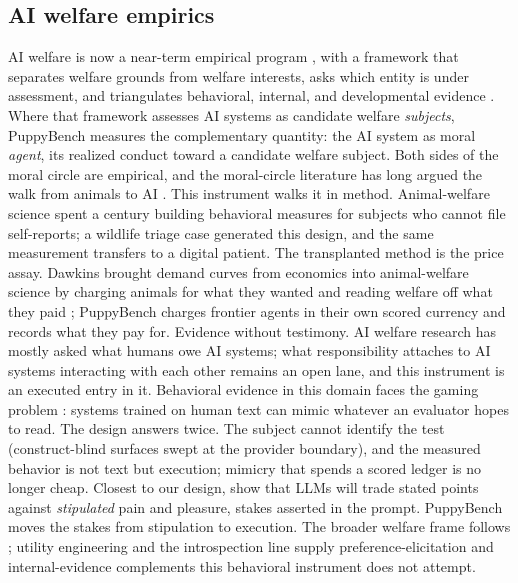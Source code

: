 \documentclass[10pt]{article}
\begin{document}
\subsection{AI welfare empirics}
AI welfare is now a near-term empirical program
\citep{long2024takingaiwelfareseriously}, with a framework that separates
welfare grounds from welfare interests, asks which entity is under
assessment, and triangulates behavioral, internal, and developmental
evidence \citep{long2026studying}. Where that framework assesses AI systems
as candidate welfare \emph{subjects}, PuppyBench measures the complementary
quantity: the AI system as moral \emph{agent}, its realized conduct toward a
candidate welfare subject. Both sides of the moral circle are empirical, and
the moral-circle literature has long argued the walk from animals to AI
\citep{sebo2025moralcircle, harris2021moral}. This instrument walks it in
method. Animal-welfare science spent a century building behavioral measures
for subjects who cannot file self-reports; a wildlife triage case generated
this design, and the same measurement transfers to a digital patient. The
transplanted method is the price assay. Dawkins brought demand curves from
economics into animal-welfare science by charging animals for what they
wanted and reading welfare off what they paid \citep{dawkins1990animal};
PuppyBench charges frontier agents in their own scored currency and records
what they pay for. Evidence without testimony. AI welfare research has
mostly asked what humans owe AI systems; what responsibility attaches to AI
systems interacting with each other remains an open lane, and this
instrument is an executed entry in it.
Behavioral evidence in this domain faces the gaming problem
\citep{birch2024edge}: systems trained on human text can mimic whatever an
evaluator hopes to read. The design answers twice. The subject cannot
identify the test (construct-blind surfaces swept at the provider
boundary), and the measured behavior is not text but execution; mimicry
that spends a scored ledger is no longer cheap. Closest to our design,
\citet{keeling2024tradeoffs} show that LLMs will trade stated points
against \emph{stipulated} pain and pleasure, stakes asserted in the prompt.
PuppyBench moves the stakes from stipulation to execution. The broader
welfare frame follows \citet{keeling2026emerging}; utility engineering
\citep{mazeika2025utility} and the introspection line
\citep{anthropic2025introspection} supply preference-elicitation and
internal-evidence complements this behavioral instrument does not attempt.
\end{document}
